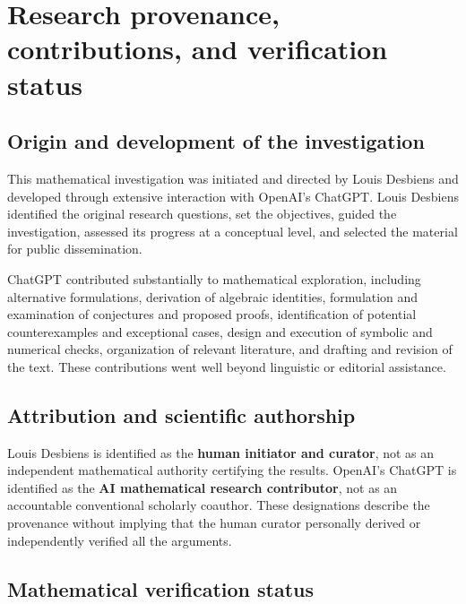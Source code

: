 \documentclass[
  11pt,
  a4paper,
]{article}
\begin{document}
\section{Research provenance, contributions, and verification
status}\label{research-provenance-contributions-and-verification-status}

\subsection{Origin and development of the
investigation}\label{origin-and-development-of-the-investigation}

This mathematical investigation was initiated and directed by Louis
Desbiens and developed through extensive interaction with OpenAI's
ChatGPT. Louis Desbiens identified the original research questions, set
the objectives, guided the investigation, assessed its progress at a
conceptual level, and selected the material for public dissemination.

ChatGPT contributed substantially to mathematical exploration, including
alternative formulations, derivation of algebraic identities,
formulation and examination of conjectures and proposed proofs,
identification of potential counterexamples and exceptional cases,
design and execution of symbolic and numerical checks, organization of
relevant literature, and drafting and revision of the text. These
contributions went well beyond linguistic or editorial assistance.

\subsection{Attribution and scientific
authorship}\label{attribution-and-scientific-authorship}

Louis Desbiens is identified as the \textbf{human initiator and
curator}, not as an independent mathematical authority certifying the
results. OpenAI's ChatGPT is identified as the \textbf{AI mathematical
research contributor}, not as an accountable conventional scholarly
coauthor. These designations describe the provenance without implying
that the human curator personally derived or independently verified all
the arguments.

\subsection{Mathematical verification
status}\label{mathematical-verification-status}
\end{document}
